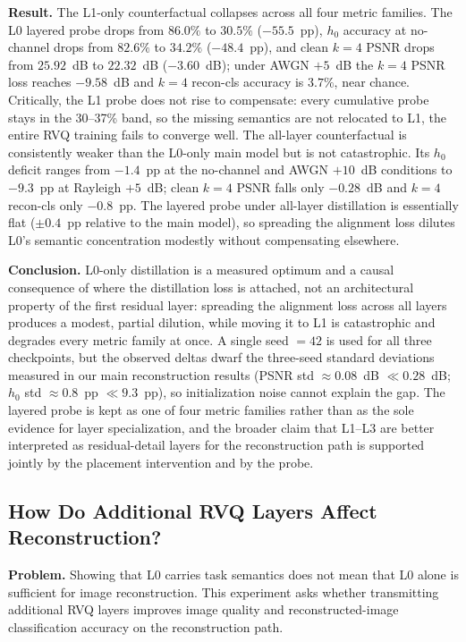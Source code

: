 \documentclass[lettersize,journal]{IEEEtran}
\begin{document}
\textbf{Result.} The L1-only counterfactual collapses across all four metric families. The L0 layered probe drops from $86.0\%$ to $30.5\%$ ($-55.5$~pp), $h_0$ accuracy at no-channel drops from $82.6\%$ to $34.2\%$ ($-48.4$~pp), and clean $k{=}4$ PSNR drops from $25.92$~dB to $22.32$~dB ($-3.60$~dB); under AWGN $+5$~dB the $k{=}4$ PSNR loss reaches $-9.58$~dB and $k{=}4$ recon-cls accuracy is $3.7\%$, near chance. Critically, the L1 probe does not rise to compensate: every cumulative probe stays in the 30--37\% band, so the missing semantics are not relocated to L1, the entire RVQ training fails to converge well. The all-layer counterfactual is consistently weaker than the L0-only main model but is not catastrophic. Its $h_0$ deficit ranges from $-1.4$~pp at the no-channel and AWGN $+10$~dB conditions to $-9.3$~pp at Rayleigh $+5$~dB; clean $k{=}4$ PSNR falls only $-0.28$~dB and $k{=}4$ recon-cls only $-0.8$~pp. The layered probe under all-layer distillation is essentially flat ($\pm0.4$~pp relative to the main model), so spreading the alignment loss dilutes L0's semantic concentration modestly without compensating elsewhere.

\textbf{Conclusion.} L0-only distillation is a measured optimum and a causal consequence of where the distillation loss is attached, not an architectural property of the first residual layer: spreading the alignment loss across all layers produces a modest, partial dilution, while moving it to L1 is catastrophic and degrades every metric family at once. A single seed $=42$ is used for all three checkpoints, but the observed deltas dwarf the three-seed standard deviations measured in our main reconstruction results (PSNR std $\approx 0.08$~dB $\ll 0.28$~dB; $h_0$ std $\approx 0.8$~pp $\ll 9.3$~pp), so initialization noise cannot explain the gap. The layered probe is kept as one of four metric families rather than as the sole evidence for layer specialization, and the broader claim that L1--L3 are better interpreted as residual-detail layers for the reconstruction path is supported jointly by the placement intervention and by the probe.

\subsection{How Do Additional RVQ Layers Affect Reconstruction?}
\textbf{Problem.} Showing that L0 carries task semantics does not mean that L0 alone is sufficient for image reconstruction. This experiment asks whether transmitting additional RVQ layers improves image quality and reconstructed-image classification accuracy on the reconstruction path.
\end{document}
